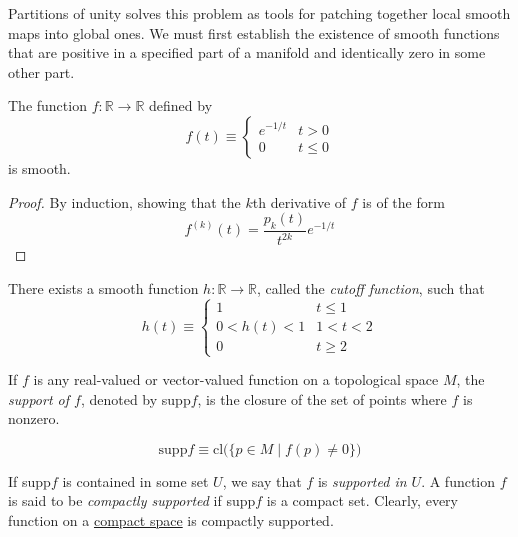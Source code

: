 \documentclass{article}
\newcounter{definition}[section]
\begin{document}
    Partitions of unity solves this problem as tools for patching together local smooth maps into global ones. We must first establish the existence of smooth functions that are positive in a specified part of a manifold and identically zero in some other part. 

    \begin{lemma}[Smoothness of $e^{-1/t}$]
      \label{thm:smoothness-of-e1t}
      The function $f: \mathbb{R} \to \mathbb{R}$ defined by 
      \begin{equation}
        f(t) \equiv \begin{cases}
                    e^{-1/t} & t > 0 \\
                    0 & t \leq 0
              \end{cases}
      \end{equation}
      is smooth. 
    \end{lemma}
    \begin{proof}
      By induction, showing that the $k$th derivative of $f$ is of the form
        \begin{equation}
          f^{(k)} (t) = \frac{p_k (t)}{t^{2k}} e^{-1/t}
        \end{equation}
    \end{proof}

    \begin{lemma}
      \label{thm:cutoff-function}
      There exists a smooth function $h: \mathbb{R} \to \mathbb{R}$, called the \textit{cutoff function}, such that 
      \begin{equation}
        h(t) \equiv \begin{cases}
                    1 & t \leq 1 \\
                    0 < h(t) < 1 & 1 < t < 2 \\
                    0 & t \geq 2
              \end{cases}
      \end{equation}
    \end{lemma}

    \begin{definition}[Support of $f$]
      \label{def:support-of-f}
      If $f$ is any real-valued or vector-valued function on a topological space $M$, the \textit{support of $f$}, denoted by supp$f$, is the closure of the set of points where $f$ is nonzero. 

        \begin{equation}
          \text{supp} f \equiv \text{cl} \big(\{p \in M\;|\; f(p) \neq 0\}\big)
        \end{equation}

      If supp$f$ is contained in some set $U$, we say that $f$ is \textit{supported in $U$}. A function $f$ is said to be \textit{compactly supported} if supp$f$ is a compact set. Clearly, every function on a \hyperref[pst-def:compact-space]{compact space} is compactly supported. 
    \end{definition}
\end{document}
